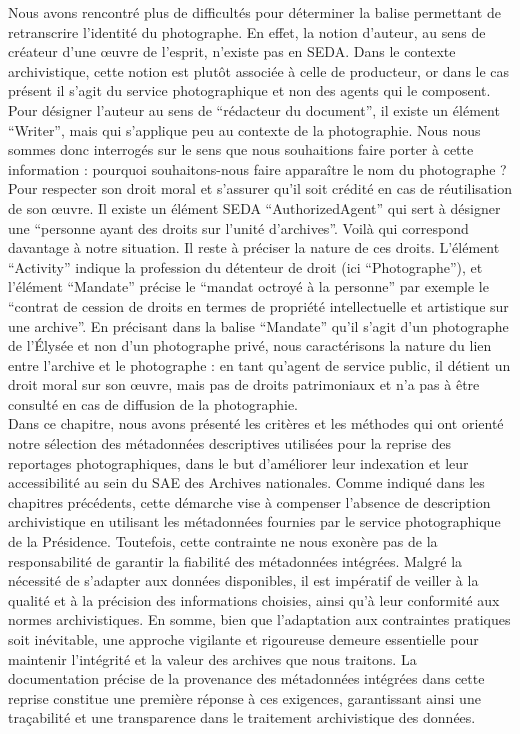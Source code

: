 Nous avons rencontré plus de difficultés pour déterminer la balise permettant de retranscrire l'identité du photographe. En effet, la notion d'auteur, au sens de créateur d'une \oe{}uvre de l'esprit, n'existe pas en SEDA. Dans le contexte archivistique, cette notion est plutôt associée à celle de producteur, or dans le cas présent il s'agit du service photographique et non des agents qui le composent. Pour désigner l'auteur au sens de \enquote{rédacteur du document}, il existe un élément \enquote{Writer}, mais qui s'applique peu au contexte de la photographie. Nous nous sommes donc interrogés sur le sens que nous souhaitions faire porter à cette information : pourquoi souhaitons-nous faire apparaître le nom du photographe ? Pour respecter son droit moral et s'assurer qu'il soit crédité en cas de réutilisation de son \oe{}uvre. Il existe un élément SEDA \enquote{AuthorizedAgent} qui sert à désigner une \enquote{personne ayant des droits sur l’unité d’archives}. Voilà qui correspond davantage à notre situation. Il reste à préciser la nature de ces droits. L'élément \enquote{Activity} indique la profession du détenteur de droit (ici \enquote{Photographe}), et l'élément \enquote{Mandate} précise le \enquote{mandat octroyé à la personne} par exemple le \enquote{contrat de cession de droits en termes de propriété intellectuelle et artistique sur une archive}. En précisant dans la balise \enquote{Mandate} qu'il s'agit d'un photographe de l'Élysée et non d'un photographe privé, nous caractérisons la nature du lien entre l'archive et le photographe : en tant qu'agent de service public, il détient un droit moral sur son \oe{}uvre, mais pas de droits patrimoniaux et n'a pas à être consulté en cas de diffusion de la photographie.
\\

Dans ce chapitre, nous avons présenté les critères et les méthodes qui ont orienté notre sélection des métadonnées descriptives utilisées pour la reprise des reportages photographiques, dans le but d'améliorer leur indexation et leur accessibilité au sein du SAE des Archives nationales. Comme indiqué dans les chapitres précédents, cette démarche vise à compenser l'absence de description archivistique en utilisant les métadonnées fournies par le service photographique de la Présidence. Toutefois, cette contrainte ne nous exonère pas de la responsabilité de garantir la fiabilité des métadonnées intégrées. Malgré la nécessité de s'adapter aux données disponibles, il est impératif de veiller à la qualité et à la précision des informations choisies, ainsi qu'à leur conformité aux normes archivistiques. En somme, bien que l'adaptation aux contraintes pratiques soit inévitable, une approche vigilante et rigoureuse demeure essentielle pour maintenir l'intégrité et la valeur des archives que nous traitons. La documentation précise de la provenance des métadonnées intégrées dans cette reprise constitue une première réponse à ces exigences, garantissant ainsi une traçabilité et une transparence dans le traitement archivistique des données.